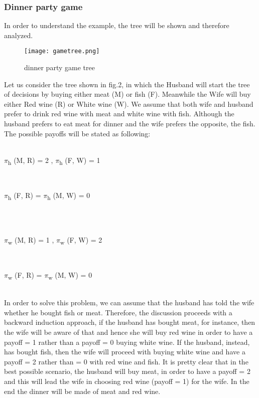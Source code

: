 \documentclass[conference]{IEEEtran}
\begin{document}
\subsubsection{Dinner party game}
In order to understand the example, the tree will be shown and therefore analyzed.
\begin{figure}[h]
    \centerline{\texttt{[image: gametree.png]}}
    \caption{dinner party game tree \cite{b7}}
    \label{gametree}
\end{figure}

Let us consider the tree shown in fig.2, in which the Husband will start the tree of decisions by buying either meat (M) or fish (F). Meanwhile the Wife will buy either Red wine (R) or White wine (W). We assume that both wife and husband prefer to drink red wine with meat and white wine with fish. Although the husband prefers to eat meat for dinner and the wife prefers the opposite, the fish. The possible payoffs will be stated as following:\\ \\
\centerline{$\pi$\textsubscript{h} (M, R) = 2 ,  $\pi$\textsubscript{h} (F, W) = 1} \\
\centerline{$\pi$\textsubscript{h} (F, R) = $\pi$\textsubscript{h} (M, W) = 0} \\\\
\centerline{$\pi$\textsubscript{w} (M, R) = 1 ,  $\pi$\textsubscript{w} (F, W) = 2} \\
\centerline{$\pi$\textsubscript{w} (F, R) = $\pi$\textsubscript{w} (M, W) = 0}
\\

In order to solve this problem, we can assume that the husband has told the wife whether he bought fish or meat. Therefore, the discussion proceeds with a backward induction approach, if the husband has bought meat, for instance, then the wife will be aware of that and hence she will buy red wine in order to have a payoff = 1 rather than a payoff = 0 buying white wine. If the husband, instead, has bought fish, then the wife will proceed with buying white wine and have a payoff = 2 rather than = 0 with red wine and fish.
It is pretty clear that in the best possible scenario, the husband will buy meat, in order to have a payoff = 2 and this will lead the wife in choosing red wine (payoff = 1) for the wife. In the end the dinner will be made of meat and red wine.\cite{b7}
\end{document}
